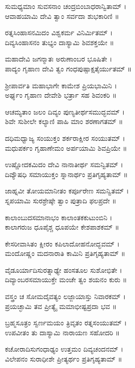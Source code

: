 ಸುಮಧ್ಯಮಾಂ ಸುವಸನಾಂ ಚಂದ್ರಬಿಂಬಾಧರಾನ್ವಿತಾಮ್ ।\\
ಆವಾಹಯಾಮಿ ದೇವಿ ತ್ವಾಂ ಸರ್ವದಾ ಶುಭಕಾರಿಣಿ ॥

ರತ್ನಸಿಂಹಾಸನಮಿದಂ ವಿಶ್ವಕರ್ಮ ವಿನಿರ್ಮಿತಮ್ ।\\
ದಿವ್ಯಸಿಂಹಾಸನಂ ತುಭ್ಯಂ ದಾಸ್ಯಾಮಿ ಶಿವಶಕ್ತಯೇ ॥

ಮಹಾದೇವಿ ಜಗನ್ಮಾತಃ ಅರುಣಾಂಬರ ಭೂಷಿತೇ ।\\
ಪಾದ್ಯಂ ಗೃಹಾಣ ದೇವಿ ತ್ವಂ ಗಂಧಪುಷ್ಪಾಕ್ಷತೈರ್ಯುತಮ್ ॥

ಶ್ರೀಪಾರ್ವತಿ ಮಹಾಭಾಗೇ ಕಾಮೇಶ ಪ್ರಿಯಭಾಮಿನಿ ।\\
ಅರ್ಘ್ಯಂ ಗೃಹಾಣ ದೇವೇಶಿ ಭರ್ತ್ರಾ ಸಹ ಶಿವಂಕರಿ ॥

ಆಚಮ್ಯತಾಂ ಜಲಂ ದಿವ್ಯಂ ಪುಣ್ಯತೀರ್ಥಸಮುದ್ಭವಮ್ ।\\
ಶಿವೇ ಸುಶೀಲೇ ಕಲ್ಯಾಣಿ ಪಾಹಿ ಮಾಂ ಶರಣಾಗತಮ್ ॥

ದಧಿಮಧ್ವಾಜ್ಯ ಸಂಯುಕ್ತಂ ಶರ್ಕರಾಕ್ಷೀರ ಸಂಯುತಮ್ ।\\
ಮಧುಪರ್ಕಂ ಗೃಹಾಣೇಮಂ ಅರ್ಪಯಾಮಿ ಶಿವಪ್ರಿಯೇ ॥

ಉಷ್ಣೋದಕಮಿದಂ ದೇವಿ ನಾನಾತೀರ್ಥ ಸಮನ್ವಿತಮ್ ।\\
ದಿವ್ಯೌಷಧಿ ಸಮಾಯುಕ್ತಂ ಸ್ನಾನಾರ್ಥಂ ಪ್ರತಿಗೃಹ್ಯತಾಮ್ ॥\\

ಜಾಹ್ನವೀ ತೋಯಮಾನೀತಂ ಕರ್ಪೂರೇಣ ಸಮನ್ವಿತಮ್ ।\\
ಸ್ನಪಯಾಮಿ ಸುರಶ್ರೇಷ್ಠೇ ತ್ವಾಂ ಪುತ್ರಾದಿ ಫಲಪ್ರದೇ ॥\\

ಕಾಲಾಂಬುದಸಮಾನಾಭಂ ಕಾಲಾಂತಕಕುಟುಂಬಿನಿ ।\\
ಕಾಲಾಗರುಜ ಧೂಪೈಶ್ಚ ಧೂಪಯೇ ಕೇಶಪಾಶಕಮ್ ॥

ಕೇಸರೀವಾಸಿತಂ ಕ್ಷೀರಂ ಕಪಿಲಾದೋಹನೋದ್ಭವಮ್ ।\\
ಮಂದೋಷ್ಣಂ ಮದನಾರಾತಿ ಕಾಮಿನಿ ಪ್ರತಿಗೃಹ್ಯತಾಮ್ ॥

ವೈಡೂರ್ಯಾದಿಸುರತ್ನಾಢ್ಯೇ ಹಂಸತೂಲ ಸುಶೋಭಿತೇ ।\\
ದಿವ್ಯಾಂಬರಸಮಾಯುಕ್ತೇ ಮಂಚೇ ತ್ವಂ ಶಯನಂ ಕುರು ॥\\

ವಸ್ತ್ರಂ ಚ ಸೋಮದೈವತ್ಯಂ ಲಜ್ಜಾಯಾಸ್ತು ನಿವಾರಕಮ್ ।\\
ಪ್ರಯಚ್ಛಾಮಿ ತವ ಪ್ರೀತ್ಯೈ ಮಮಾಭೀಷ್ಟಪ್ರದಾ ಭವ ॥

ಬ್ರಹ್ಮಸೂತ್ರಂ ಸ್ವರ್ಣಮಯಂ ತ್ರಿವೃತಂ ರತ್ನಸಂಯುತಮ್ ।\\
ಉಪವೀತಂ ತು ದಾಸ್ಯಾಮಿ ನಾರಾಯಣ ಸಹೋದರಿ ॥

ಕಚೋರಾದಿಸುಗಂಧಾಢ್ಯಂ ಉತ್ತಮಂ ದಿವ್ಯಚಂದನಮ್ ।\\
ವಿಲೇಪನಂ ಸುರಾಧೀಶೇ ಪ್ರೀತ್ಯರ್ಥಂ ಪ್ರತಿಗೃಹ್ಯತಾಮ್ ॥

